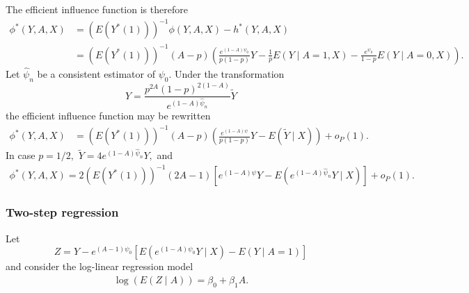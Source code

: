 \message{ !name(manuscript.tex)}\documentclass[10pt,a4paper]{amsart}
\newcommand{\EE}{E}
\newcommand{\E}[1]{\EE(Y\mid A=#1,X)}
\begin{document}
The efficient influence function is therefore
\begin{align*}
  \phi^*(Y,A,X) &= (\EE(Y^*(1)))^{-1} \phi(Y,A,X) - h^*(Y,A,X)\\
                &= (\EE(Y^*(1)))^{-1} (A-p)\left(\frac{e^{(1-A)\psi_0}}{p(1-p)}Y - \frac{1}{p}\E1 - \frac{e^{\psi_0}}{1-p}\E0\right).
\end{align*}
Let $\hat{\psi}_n$ be a consistent estimator of $\psi_0$. Under the transformation
\[
  Y = \frac{p^{2A}(1-p)^{2(1-A)}}{e^{(1-A)\hat{\psi}_n}}\tilde{Y}
\]
the efficient influence function may be rewritten
\begin{align*}
  \phi^*(Y,A,X) &= (\EE(Y^*(1)))^{-1}(A-p)\left(\frac{e^{(1-A)\psi}}{p(1-p)} Y - \EE(\tilde{Y}\mid X)\right) + o_P(1).
\end{align*}
In case $p=1/2,$ $\tilde{Y}=4e^{(1-A)\hat{\psi}_n}Y,$ and
\begin{align}
  \phi^*(Y,A,X) = 2(\EE(Y^*(1)))^{-1}(2A-1)[e^{(1-A)\psi}Y - \EE(e^{(1-A)\hat{\psi}_n}Y\mid X)] + o_P(1).\label{fla:inf_2_simple}
\end{align}

\subsubsection{Two-step regression}
Let
\[
  Z = Y - e^{(A-1)\psi_0}[\EE(e^{(1-A)\psi_0}Y\mid X) - \EE(Y\mid A=1)]
\]
and consider the log-linear regression model
\begin{align}
  \log(\EE(Z\mid A)) = \beta_0 + \beta_1A.\label{model:loglinear}
\end{align}
\end{document}
